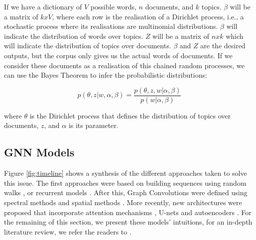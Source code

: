 \documentclass[smallextended]{svjour3}
\begin{document}
\begin{appendices}
		If we have a dictionary of $V$ possible words, $n$ documents, and $k$ topics. $\beta$ will be a matrix of $kxV$, where each row is the realisation of a Dirichlet process, i.e., a stochastic process where its realisations are multinomial distributions. $\beta$ will indicate the distribution of words over topics. $Z$ will be a matrix of $nxk$ which will indicate the distribution of topics over documents. $\beta$ and $Z$ are the desired outputs, but the corpus only gives us the actual words of documents. If we consider these documents as a realisation of this chained random processes, we can use the Bayes Theorem to infer the probabilistic distributions: 
		
		$$
		p(\theta,z|w,\alpha,\beta) = \frac{p(\theta,z,w|\alpha,\beta)}{p(w|\alpha,\beta)}
		$$
		
		where $\theta$ is the Dirichlet process that defines the distribution of topics over documents, $z$, and $\alpha$ is its parameter.
		
		\subsection{GNN Models}
		\label{sec:gnn_models}
		Figure \ref{fig:timeline} shows a synthesis of the different approaches taken to solve this issue. The first approaches were based on building sequences using random walks \cite{perozzi_deepwalk_2014}, or recurrent models \cite{scarselli_graph_2009}. After this, Graph Convolutions were defined using spectral methods \cite{bruna_spectral_2014} and spatial methods \cite{hamilton_inductive_2017}. More recently, new architectures were proposed that incorporate attention mechanisms \cite{velickovic_graph_2018}, U-nets \cite{gao_graph_2019} and autoencoders \cite{kipf_variational_2016}. For the remaining of this section, we present these models' intuitions, for an in-depth literature review, we refer the readers to \cite{hamilton_representation_2017,bacciu_gentle_2020, zhou_graph_2018,wu_comprehensive_2020}.
		

\end{appendices}
\end{document}
